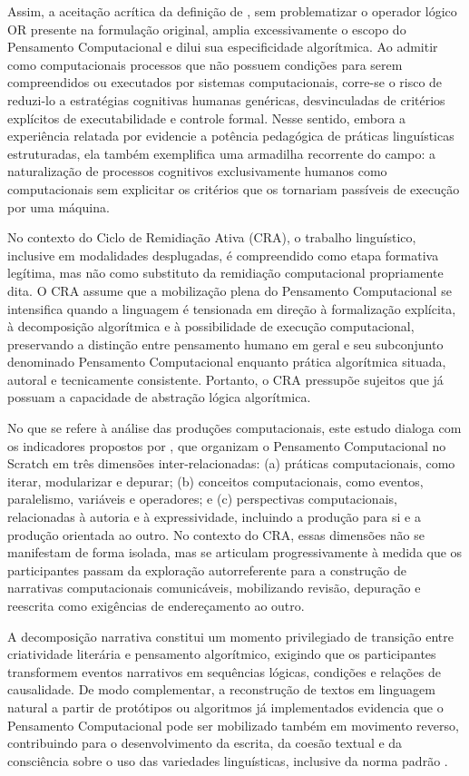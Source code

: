 \documentclass[portuguese]{textolivre}
\begin{document}
Assim, a aceitação acrítica da definição de \textcite{wing2006}, sem problematizar o operador lógico OR presente na formulação original, amplia excessivamente o escopo do Pensamento Computacional e dilui sua especificidade algorítmica. Ao admitir como computacionais processos que não possuem condições para serem compreendidos ou executados por sistemas computacionais, corre-se o risco de reduzi-lo a estratégias cognitivas humanas genéricas, desvinculadas de critérios explícitos de executabilidade e controle formal. Nesse sentido, embora a experiência relatada por \textcite{sassi2023} evidencie a potência pedagógica de práticas linguísticas estruturadas, ela também exemplifica uma armadilha recorrente do campo: a naturalização de processos cognitivos exclusivamente humanos como computacionais sem explicitar os critérios que os tornariam passíveis de execução por uma máquina.

No contexto do Ciclo de Remidiação Ativa (CRA), o trabalho linguístico, inclusive em modalidades desplugadas, é compreendido como etapa formativa legítima, mas não como substituto da remidiação computacional propriamente dita. O CRA assume que a mobilização plena do Pensamento Computacional se intensifica quando a linguagem é tensionada em direção à formalização explícita, à decomposição algorítmica e à possibilidade de execução computacional, preservando a distinção entre pensamento humano em geral e seu subconjunto denominado Pensamento Computacional enquanto prática algorítmica situada, autoral e tecnicamente consistente. Portanto, o CRA pressupõe sujeitos que já possuam a capacidade de abstração lógica algorítmica.

No que se refere à análise das produções computacionais, este estudo dialoga com os indicadores propostos por \textcite{brennan2012}, que organizam o Pensamento Computacional no Scratch em três dimensões inter-relacionadas: (a) práticas computacionais, como iterar, modularizar e depurar; (b) conceitos computacionais, como eventos, paralelismo, variáveis e operadores; e (c) perspectivas computacionais, relacionadas à autoria e à expressividade, incluindo a produção para si e a produção orientada ao outro. No contexto do CRA, essas dimensões não se manifestam de forma isolada, mas se articulam progressivamente à medida que os participantes passam da exploração autorreferente para a construção de narrativas computacionais comunicáveis, mobilizando revisão, depuração e reescrita como exigências de endereçamento ao outro.

A decomposição narrativa constitui um momento privilegiado de transição entre criatividade literária e pensamento algorítmico, exigindo que os participantes transformem eventos narrativos em sequências lógicas, condições e relações de causalidade. De modo complementar, a reconstrução de textos em linguagem natural a partir de protótipos ou algoritmos já implementados evidencia que o Pensamento Computacional pode ser mobilizado também em movimento reverso, contribuindo para o desenvolvimento da escrita, da coesão textual e da consciência sobre o uso das variedades linguísticas, inclusive da norma padrão \cite{faraco2015}.
\end{document}
